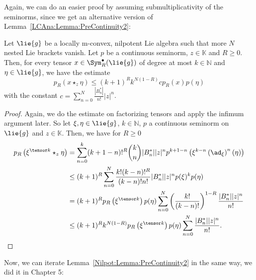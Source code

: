 Again, we can do an easier proof by assuming submultiplicativity of the 
seminorms, since we get an alternative version of 
Lemma~\ref{LCAna:Lemma:PreContinuity2}:
\begin{lemma}
	\label{Nilpot:Lemma:PreContinuity2}
	Let $\lie{g}$ be a locally m-convex, nilpotent Lie algebra such that more 
	$N$ nested Lie brackets vanish. Let $p$ be a continuous seminorm, 
	$z \in \mathbb{K}$ and $R \geq 0$. Then, for every tensor 
	$x \in \Sym_R^{\bullet}(\lie{g})$ of degree at most $k \in \mathbb{N}$ and 
	$\eta \in \lie{g}$, 	we have the estimate
	\begin{equation}
		\label{Nilpot:PreContinuity}
		p_R \left( x \star_z \eta \right)
		\leq
		(k + 1)^R k^{N (1-R)} c
		p_R (x) p(\eta)
	\end{equation}
	with the constant $c = \sum_{n = 0}^N \frac{|B_n^*|}{n!} |z|^n$.
\end{lemma}
\begin{proof}
	Again, we do the estimate on factorizing tensors and apply the infimum 
	argument later. So let $\xi, \eta \in \lie{g}$, $k \in \mathbb{N}$, $p$ a 
	continuous seminorm on $\lie{g}$ and $z \in \mathbb{K}$. Then, we have for 
	$R \geq 0$
	\begin{align*}
		p_R \left(
			\xi^{ \tensor k } \star_z \eta
		\right)
		& =
		\sum\limits_{n = 0}^k
		(k + 1 - n)!^R \binom{k}{n}
		|B_n^*| |z|^n
		p^{k + 1 - n} \left(
			\xi^{k-n}
			\left( \ad_{\xi} \right)^n (\eta)
		\right)
		\\
		& \leq
		(k + 1)^R
		\sum\limits_{n = 0}^N
		\frac{ k! (k-n)!^R }{ (k-n)! n! }
		|B_n^*| |z|^n
		p(\xi)^k p(\eta)
		\\
		& =
		(k + 1)^R
		p_R \left( \xi^{\tensor k} \right)
		p(\eta)
		\sum\limits_{n = 0}^N
		\left( \frac{k!}{(k-n)!} \right)^{1-R}
		\frac{|B_n^*| |z|^n}{n!}
		\\
		& \leq
		(k + 1)^R
		k^{N (1-R)}
		p_R \left( \xi^{\tensor k} \right)
		p(\eta)
		\sum\limits_{n = 0}^N
		\frac{|B_n^*| |z|^n}{n!}.
	\end{align*}
\end{proof}
Now, we can iterate Lemma~\ref{Nilpot:Lemma:PreContinuity2} in the same way, 
we did it in Chapter 5:
